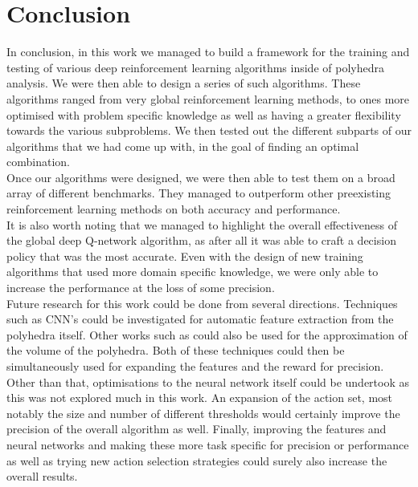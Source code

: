 
\chapter{Conclusion}

In conclusion, in this work we managed to build a framework for the training and testing of various deep reinforcement learning algorithms inside of polyhedra analysis. We were then able to design a series of such algorithms. These algorithms ranged from very global reinforcement learning methods, to ones more optimised with problem specific knowledge as well as having a greater flexibility towards the various subproblems. We then tested out the different subparts of our algorithms that we had come up with, in the goal of finding an optimal combination.\\
Once our algorithms were designed, we were then able to test them on a broad array of different benchmarks. They managed to outperform other preexisting reinforcement learning methods on both accuracy and performance.\\
It is also worth noting that we managed to highlight the overall effectiveness of the global deep Q-network algorithm, as after all it was able to craft a decision policy that was the most accurate. Even with the design of new training algorithms that used more domain specific knowledge, we were only able to increase the performance at the loss of some precision.\\
Future research for this work could be done from several directions. Techniques such as CNN's could be investigated for automatic feature extraction from the polyhedra itself. Other works such as \cite{dyer1991random, kim2004fast} could also be used for the approximation of the volume of the polyhedra. Both of these techniques could then be simultaneously used for expanding the features and the reward for precision. Other than that, optimisations to the neural network itself could be undertook as this was not explored much in this work. An expansion of the action set, most notably the size and number of different thresholds would certainly improve the precision of the overall algorithm as well. Finally, improving the features and neural networks and making these more task specific for precision or performance as well as trying new action selection strategies could surely also increase the overall results. 

